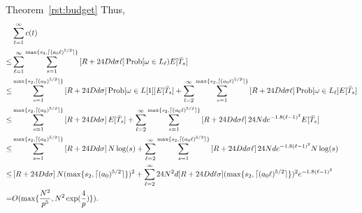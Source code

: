 \begin{extraproof}{Theorem~\ref{rst:budget}}
Thus,
\begin{align*}
&\sum_{t=1}^{\infty}c(t)  \\
\leq&\sum_{\ell=1}^{\infty}\sum_{s=1}^{\max\{s_2,\lceil (a_0 \ell)^{5/2} \rceil\}}\left[\MAXR+24\Diam d\sigma \ell\right]\Prob{\SP\in \Env{\ell})E[\bar{T}_{s}}  \\
\leq& \sum_{s=1}^{\max\{s_2,\lceil (a_0)^{5/2} \rceil\}}\left[\MAXR+24\Diam d\sigma \right]\Prob{\SP\in L[1]}E[\bar{T}_{s}] +\sum_{l=2}^{\infty}\sum_{s=1}^{\max\{s_2,\lceil (a_0 \ell)^{5/2} \rceil\}}\left[\MAXR+24\Diam d\sigma \ell\right]\Prob{\SP\in \Env{\ell}}E[\bar{T}_{s}]  \\
\leq& \sum_{s=1}^{\max\{s_2,\lceil (a_0)^{5/2} \rceil\}}\left[R+24\Diam d\sigma \right]E[\bar{T}_{s}] +\sum_{\ell=2}^{\infty}\sum_{s=1}^{\max\{s_2,\lceil (a_0 \ell)^{5/2} \rceil\}}\left[\MAXR+24\Diam d\sigma \ell\right]24\ARMNUM d e^{-1.8(\ell-1)^2}E[\bar{T}_{s}] \\
\leq& \sum_{s=1}^{\max\{s_2,\lceil (a_0)^{5/2} \rceil\}}\left[\MAXR+24\Diam d\sigma \right]\ARMNUM \log(s) +\sum_{\ell=2}^{\infty}\sum_{s=1}^{\max\{s_2,\lceil (a_0 \ell)^{5/2} \rceil\}}\left[\MAXR+24\Diam d\sigma \ell\right]24 \ARMNUM d e^{-1.8(\ell-1)^2}\ARMNUM \log(s)  \\
\leq & \left[\MAXR+24\Diam d\sigma \right]\ARMNUM (\max\{s_2,\lceil (a_0)^{5/2} \rceil\})^2+\sum_{\ell=2}^{\infty}24\ARMNUM^2 d[\MAXR+24\Diam d\ell\sigma](\max\{s_2,\lceil (a_0 \ell)^{5/2} \rceil\})^2 e^{-1.8(\ell-1)^2}  \\
=& O(\max\{\frac{\ARMNUM^2}{\MinProb^5},\ARMNUM^2\exp(\frac{4}{\MinProb})\}). 
\end{align*}

\end{extraproof}
